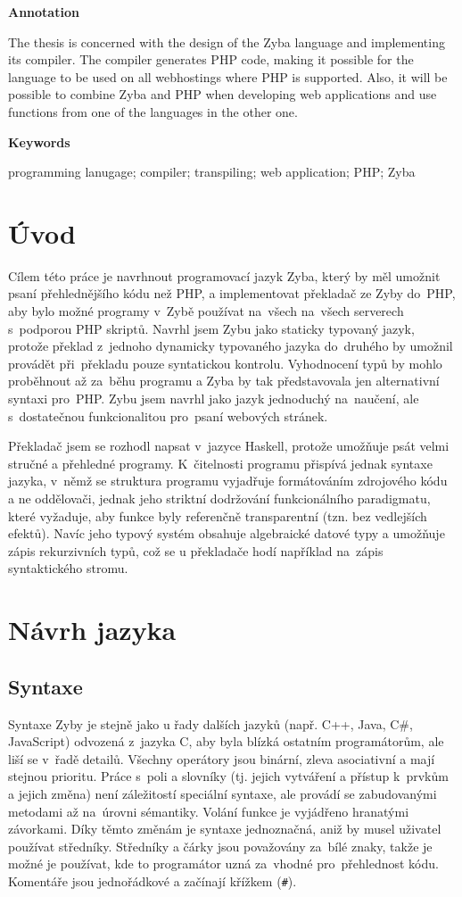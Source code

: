 \documentclass[a4paper,12pt]{article}
\begin{document}
\Large\textbf{Annotation}\normalsize

The thesis is concerned with the design of the Zyba language and implementing its compiler. The compiler generates PHP code, making it possible for the language to be used on all webhostings where PHP is supported. Also, it will be possible to combine Zyba and PHP when developing web applications and use functions from one of the languages in the other one.

\Large\textbf{Keywords}\normalsize

programming lanugage; compiler; transpiling; web application; PHP; Zyba
\newpage
\thispagestyle{empty}
\tableofcontents
\newpage
\section{Úvod}
Cílem této práce je navrhnout programovací jazyk Zyba, který by měl umožnit psaní přehlednějšího kódu než PHP, a implementovat překladač ze Zyby do~PHP, aby bylo možné programy v~Zybě používat na~všech na~všech serverech s~podporou PHP skriptů. Navrhl jsem Zybu jako staticky typovaný jazyk, protože překlad z~jednoho dynamicky typovaného jazyka do~druhého by umožnil provádět při~překladu pouze syntatickou kontrolu. Vyhodnocení typů by mohlo proběhnout až za~běhu programu a Zyba by tak představovala jen alternativní syntaxi pro~PHP. Zybu jsem navrhl jako jazyk jednoduchý na~naučení, ale s~dostatečnou funkcionalitou pro~psaní webových stránek.

Překladač jsem se rozhodl napsat v~jazyce Haskell, protože umožňuje psát velmi stručné a přehledné programy. K~čitelnosti programu přispívá jednak syntaxe jazyka, v~němž se struktura programu vyjadřuje formátováním zdrojového kódu a ne oddělovači, jednak jeho striktní dodržování funkcionálního paradigmatu, které vyžaduje, aby funkce byly referenčně transparentní (tzn. bez vedlejších efektů). Navíc jeho typový systém obsahuje algebraické datové typy a umožňuje zápis rekurzivních typů, což se u překladače hodí například na~zápis syntaktického stromu.

\section{Návrh jazyka}
\subsection{Syntaxe}
Syntaxe Zyby je stejně jako u řady dalších jazyků (např. C++, Java, C\#, JavaScript) odvozená z~jazyka C, aby byla blízká ostatním programátorům, ale liší se v~řadě detailů. Všechny operátory jsou binární, zleva asociativní a mají stejnou prioritu. Práce s~poli a slovníky (tj. jejich vytváření a přístup k~prvkům a jejich změna) není záležitostí speciální syntaxe, ale provádí se zabudovanými metodami až na~úrovni sémantiky. Volání funkce je vyjádřeno hranatými závorkami. Díky těmto změnám je syntaxe jednoznačná, aniž by musel uživatel používat středníky. Středníky a čárky jsou považovány za~bílé znaky, takže je možné je používat, kde to programátor uzná za~vhodné pro~přehlednost kódu. Komentáře jsou jednořádkové a začínají křížkem (\texttt{\#}).
\end{document}
